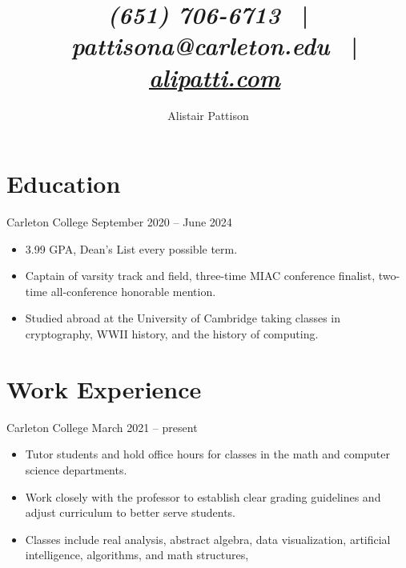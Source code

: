 \documentclass{ali-resume}
\author{Alistair Pattison}
\title{
    {\it (651) 706-6713}
    \ | \ 
    {\it pattisona@carleton.edu}
    \ | \ 
    \href{http://alipatti.com}{\it alipatti.com}
}
\begin{document}
\maketitle

\section{Education}

{Carleton College}
{September 2020 -- June 2024}

\begin{itemize}
	\item 3.99 GPA, Dean's List every possible term.
	\item Captain of varsity track and field, three-time MIAC conference finalist, two-time all-conference honorable mention.
	\item Studied abroad at the University of Cambridge taking classes in cryptography, WWII history, and the history of computing.
\end{itemize}



\section{Work Experience}



{Carleton College}
{March 2021 -- present}

\begin{itemize}
	\item Tutor students and hold office hours for classes in the math and computer science departments.
	\item Work closely with the professor to establish clear grading guidelines and adjust curriculum to better serve students.
	\item Classes include
	      real analysis, %
	      abstract algebra, %
	      data visualization, %
	      artificial intelligence, %
	      algorithms, %
	      and math structures, %
\end{itemize}
\end{document}
